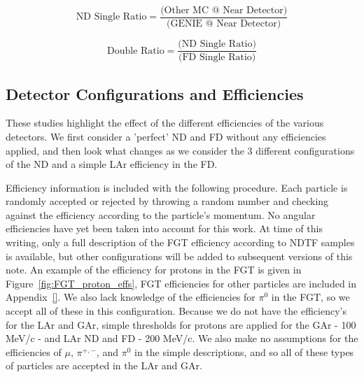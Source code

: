 \documentclass[12pt]{article}
\begin{document}
\begin{equation}
\label{eq:single_ratio}
\textrm{ND Single Ratio} = \frac{\textrm{(Other MC @ Near Detector)}}{\textrm{(GENIE @ Near Detector)}}
\end{equation}

\begin{equation}
\label{eq:double_ratio}
\textrm{Double Ratio} = \frac{\textrm{(ND Single Ratio)}}{\textrm{(FD Single Ratio)}}
\end{equation}

\subsection{Detector Configurations and Efficiencies}
\label{subsec:eff}
These studies highlight the effect of the different efficiencies of the various detectors. We first consider a 'perfect' ND and FD without any efficiencies applied, and then look what changes as we consider the 3 different configurations of the ND and a simple LAr efficiency in the FD. 

Efficiency information is included with the following procedure. Each particle is randomly accepted or rejected by throwing a random number and checking against the efficiency according to the particle's momentum. No angular efficiencies have yet been taken into account for this work. At time of this writing, only a full description of the FGT efficiency according to NDTF samples is available, but other configurations will be added to subsequent versions of this note. An example of the efficiency for protons in the FGT is given in Figure~\ref{fig:FGT_proton_effs}, FGT efficiencies for other particles are included in Appendix~\ref{}. We also lack knowledge of the efficiencies for $\pi^0$ in the FGT, so we accept all of these in this configuration. Because we do not have the efficiency's for the LAr and GAr, simple thresholds for protons are applied for the GAr - 100 MeV/c - and LAr ND and FD - 200 MeV/c. We also make no assumptions for the efficiencies of $\mu$, $\pi^{+,-}$, and $\pi^{0}$ in the simple  descriptions, and so all of these types of particles are accepted in the LAr and GAr.
\end{document}
